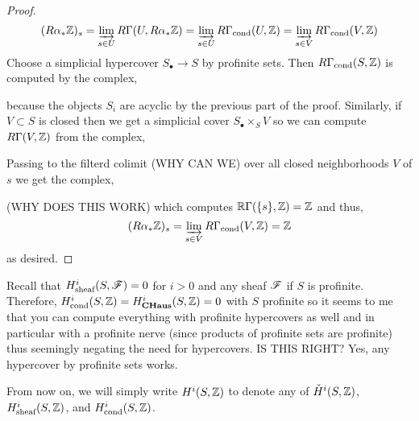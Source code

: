 \documentclass[12pt]{article}
\newcommand{\cond}{\text{cond}}
\newcommand{\sheaf}{\text{sheaf}}
\renewcommand{\Cech}{\text{\v{C}ech}\xspace}
\begin{document}
\begin{proof}
\[ (R \alpha_* \Z)_s = \dlim_{s \in U} R \Gamma(U, R \alpha_* \Z) = \dlim_{s \in U} R \Gamma_{\cond}(U, \Z) = \dlim_{s \in V} R \Gamma_{\cond}(V, \Z) \]
Choose a simplicial hypercover $S_\bullet \to S$ by profinite sets. Then $R \Gamma_{\cond}(S, \Z)$ is computed by the complex,
\begin{center}
\end{center}
because the objects $S_i$ are acyclic by the previous part of the proof. Similarly, if $V \subset S$ is closed then we get a simplicial cover $S_\bullet \times_S V$ so we can compute $R \Gamma(V, \mathbb{Z})$ from the complex,
\begin{center}
\end{center}
Passing to the filterd colimit (WHY CAN WE) over all closed neighborhoods $V$ of $s$ we get the complex,
\begin{center}
\end{center}
(WHY DOES THIS WORK)
which computes $\mathbb{R}\Gamma(\{ s \}, \mathbb{Z}) = \mathbb{Z}$ and thus,
\[ (R \alpha_* \Z)_s = \dlim_{s \in V} R \Gamma_{\cond}(V, \Z) = \Z \]
as desired.
\end{proof}

\begin{rmk}
Recall that $H^i_{\sheaf}(S, \F) = 0$ for $i > 0$ and any sheaf $\mathscr{F}$ if $S$ is profinite. Therefore, $H^i_{\cond}(S, \Z) = H^i_{\CHaus}(S, \Z) = 0$ with $S$ profinite so it seems to me that you can compute everything with profinite hypercovers as well and in particular with a profinite \Cech nerve (since products of profinite sets are profinite) thus seemingly negating the need for hypercovers. IS THIS RIGHT? Yes, any hypercover by profinite sets works.
\end{rmk}

\begin{rmk}
From now on, we will simply write $H^i(S, \mathbb{Z})$ to denote any of $\check{H}^i(S, \mathbb{Z})$, $H^i_{\sheaf}(S, \Z)$, and $H^i_{\cond}(S, \Z)$.
\end{rmk}
\end{document}
